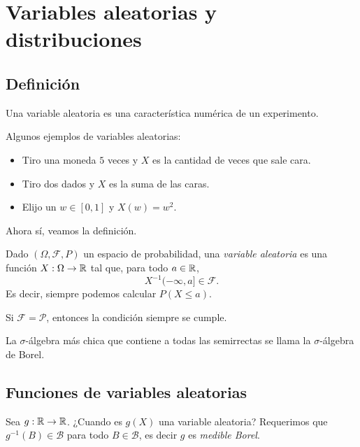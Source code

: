\chapter{Variables aleatorias y distribuciones}

\section{Definición}

Una variable aleatoria es una característica numérica de un experimento.

\begin{example}
    Algunos ejemplos de variables aleatorias:
    \begin{itemize}
        \item Tiro una moneda $5$ veces y $X$ es la cantidad de veces que sale cara.

        \item Tiro dos dados y $X$ es la suma de las caras.
        
        \item Elijo un $w \in [0, 1]$ y $X(w) = w^2$.
    \end{itemize}
\end{example}

Ahora sí, veamos la definición.

\begin{definition}
    Dado $(\Omega, \mathcal{F}, P)$ un espacio de probabilidad, una \emph{variable aleatoria} es una función $X: \Omega \to \mathbb{R}$ tal que, para todo $a \in \mathbb{R}$, 
    \begin{equation*}
        X^{-1} (-\infty , a] \in \mathcal{F}.
    \end{equation*}
    Es decir, siempre podemos calcular $P(X \leq a)$.
\end{definition}

\begin{remark}
    Si $\mathcal{F} = \mathcal{P}$, entonces la condición siempre se cumple.
\end{remark}

La $\sigma$-álgebra más chica que contiene a todas las semirrectas se llama la $\sigma$-álgebra de Borel.


\section{Funciones de variables aleatorias}

Sea $g: \mathbb{R} \to \mathbb{R}$. ¿Cuando es $g(X)$ una variable aleatoria? Requerimos que $g^{-1}(B) \in \mathcal{B}$ para todo $B \in \mathcal{B}$, es decir $g$ es \textit{medible Borel}.


